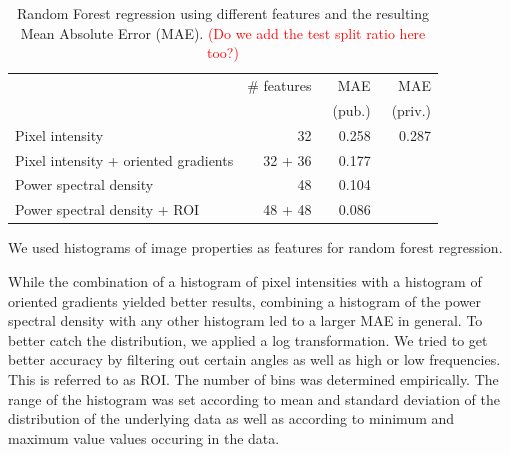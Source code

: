 \documentclass[10pt,conference,compsocconf]{IEEEtran}
\newcommand\TODO[1]{\textcolor{red}{#1}} %
\begin{document}

\begin{table}\centering
\begin{tabular}{lrrr}
\toprule
& \# features & MAE & MAE \\
& & ~(pub.) & ~(priv.) \\
\midrule
Pixel intensity & 32 & 0.258 & 0.287  \\
Pixel intensity + oriented gradients & 32 + 36 & 0.177 & \\
Power spectral density & 48 & 0.104 & \\
Power spectral density + ROI & 48 + 48 & 0.086 & \\
\bottomrule
\end{tabular}
\caption{Random Forest regression using different features and the resulting Mean Absolute Error (MAE). \TODO{(Do we add the test split ratio here too?)}}\label{tab:RF}
\end{table}


We used histograms of image properties as features for random forest regression.

While the combination of a histogram of pixel intensities with a histogram of oriented gradients yielded better results, combining a histogram of the power spectral density with any other histogram led to a larger MAE in general. To better catch the distribution, we applied a log transformation. We tried to get better accuracy by filtering out certain angles as well as high or low frequencies. This is referred to as ROI. The number of bins was determined empirically. The range of the histogram was set according to mean and standard deviation of the distribution of the underlying data as well as according to minimum and maximum value values occuring in the data.
\end{document}
